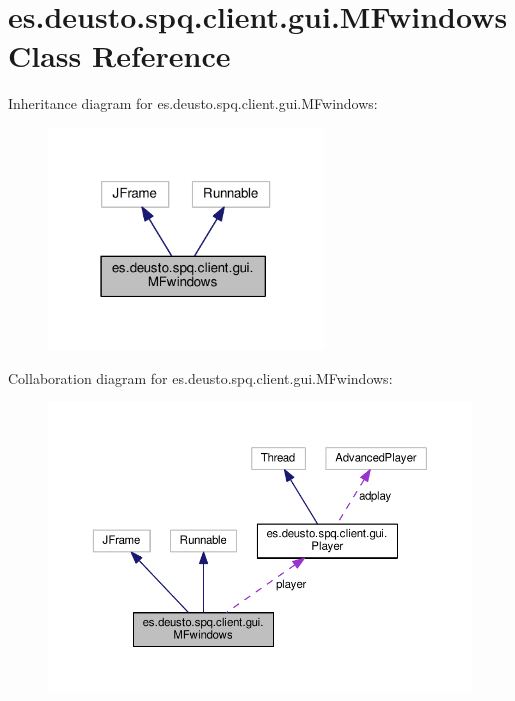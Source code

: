 \hypertarget{classes_1_1deusto_1_1spq_1_1client_1_1gui_1_1_m_fwindows}{}\section{es.\+deusto.\+spq.\+client.\+gui.\+M\+Fwindows Class Reference}
\label{classes_1_1deusto_1_1spq_1_1client_1_1gui_1_1_m_fwindows}


Inheritance diagram for es.\+deusto.\+spq.\+client.\+gui.\+M\+Fwindows\+:\nopagebreak
\begin{figure}[H]
\begin{center}
\leavevmode
\includegraphics[width=207pt]{classes_1_1deusto_1_1spq_1_1client_1_1gui_1_1_m_fwindows__inherit__graph}
\end{center}
\end{figure}


Collaboration diagram for es.\+deusto.\+spq.\+client.\+gui.\+M\+Fwindows\+:\nopagebreak
\begin{figure}[H]
\begin{center}
\leavevmode
\includegraphics[width=350pt]{classes_1_1deusto_1_1spq_1_1client_1_1gui_1_1_m_fwindows__coll__graph}
\end{center}
\end{figure}
